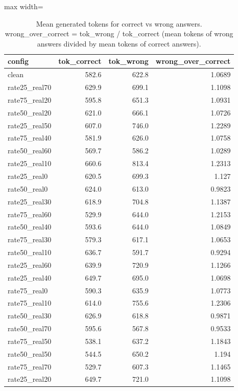 \documentclass[11pt]{article}
\begin{document}
\begin{table}[H]
\centering
\caption{Mean generated tokens for correct vs wrong answers. wrong\_over\_correct = tok\_wrong / tok\_correct (mean tokens of wrong answers divided by mean tokens of correct answers).}
\small
\begin{adjustbox}{max width=\textwidth}
\begin{tabular}{lrrr}
\toprule
\textbf{config} & \textbf{tok\_correct} & \textbf{tok\_wrong} & \textbf{wrong\_over\_correct} \\
\midrule
clean & 582.6 & 622.8 & 1.0689 \\
rate25\_real70 & 629.9 & 699.1 & 1.1098 \\
rate75\_real20 & 595.8 & 651.3 & 1.0931 \\
rate50\_real20 & 621.0 & 666.1 & 1.0726 \\
rate25\_real50 & 607.0 & 746.0 & 1.2289 \\
rate75\_real40 & 581.9 & 626.0 & 1.0758 \\
rate50\_real60 & 569.7 & 586.2 & 1.0289 \\
rate25\_real10 & 660.6 & 813.4 & 1.2313 \\
rate25\_real0 & 620.5 & 699.3 & 1.127 \\
rate50\_real0 & 624.0 & 613.0 & 0.9823 \\
rate25\_real30 & 618.9 & 704.8 & 1.1387 \\
rate75\_real60 & 529.9 & 644.0 & 1.2153 \\
rate50\_real40 & 593.6 & 644.0 & 1.0849 \\
rate75\_real30 & 579.3 & 617.1 & 1.0653 \\
rate50\_real10 & 636.7 & 591.7 & 0.9294 \\
rate25\_real60 & 639.9 & 720.9 & 1.1266 \\
rate25\_real40 & 649.7 & 695.0 & 1.0698 \\
rate75\_real0 & 590.3 & 635.9 & 1.0773 \\
rate75\_real10 & 614.0 & 755.6 & 1.2306 \\
rate50\_real30 & 626.9 & 618.8 & 0.9871 \\
rate50\_real70 & 595.6 & 567.8 & 0.9533 \\
rate75\_real50 & 538.1 & 637.2 & 1.1843 \\
rate50\_real50 & 544.5 & 650.2 & 1.194 \\
rate75\_real70 & 529.7 & 607.3 & 1.1465 \\
rate25\_real20 & 649.7 & 721.0 & 1.1098 \\

\end{tabular}
\end{adjustbox}
\end{table}
\end{document}
